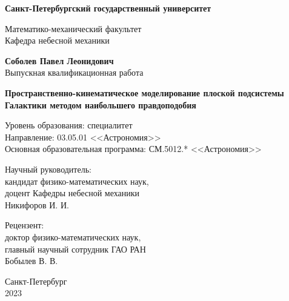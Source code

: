 \documentclass[a4paper, oneside, 14pt]{article}
\newcommand{\npar}{\par\vspace{\baselineskip}}
\begin{document}
\begin{titlepage}
  \begin{center}
    {
      \Large
      \textbf{Санкт-Петербургский государственный университет}

      Математико-механический факультет\\
      Кафедра небесной механики\par
    }

    \vfill

    {
      \Large
      \textbf{Соболев Павел Леонидович}\\
      Выпускная квалификационная работа\par
    }

    \vspace{0.5cm}

    {
      \LARGE
      \textbf{Пространственно-кинематическое моделирование плоской подсистемы Галактики методом наибольшего правдоподобия}\par
    }

    \vspace{0.5cm}

    {
      \Large

      Уровень образования: специалитет\\
      Направление: 03.05.01 <<Астрономия>>\\
      Основная образовательная программа: СМ.5012.* <<Астрономия>>\par
    }

    \vfill

    \begin{flushright}
      \large

      Научный руководитель:\\
      кандидат физико-математических наук,\\
      доцент Кафедры небесной механики\\
      Никифоров И. И.\npar

      Рецензент:\\
      доктор физико-математических наук,\\
      главный научный сотрудник ГАО РАН\\
      Бобылев В. В.\par

    \end{flushright}

    \vfill

    {
      \Large
      Санкт-Петербург\\
      2023\par
    }
  \end{center}
\end{titlepage}
\end{document}
